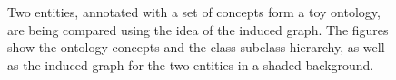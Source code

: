 \begin{figure}
    \centering
    
    \caption[Group-wise measures in action]{Two entities, annotated with a set of concepts form a toy ontology, are being compared using the idea of the induced graph. The figures show the ontology concepts and the class-subclass hierarchy, as well as the induced graph for the two entities in a shaded background.}
    \label{fig:induced-graph}
\end{figure}

